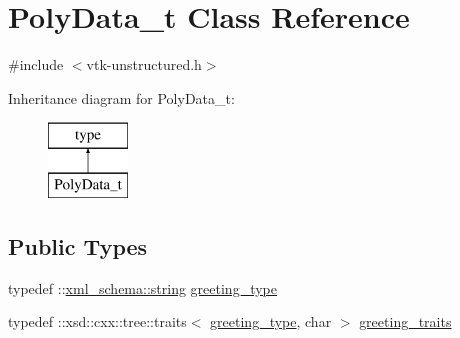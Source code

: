 \hypertarget{classPolyData__t}{}\section{Poly\+Data\+\_\+t Class Reference}
\label{classPolyData__t}


{\ttfamily \#include $<$vtk-\/unstructured.\+h$>$}

Inheritance diagram for Poly\+Data\+\_\+t\+:\begin{figure}[H]
\begin{center}
\leavevmode
\includegraphics[height=2.000000cm]{classPolyData__t}
\end{center}
\end{figure}
\subsection*{Public Types}
\begin{DoxyCompactItemize}
\item 
typedef \+::\hyperlink{namespacexml__schema_ac0cec83a330f0024e4e318b3deac5104}{xml\+\_\+schema\+::string} \hyperlink{classPolyData__t_ae1f86bd7b6a37a0d0851de8a44627177}{greeting\+\_\+type}
\item 
typedef \+::xsd\+::cxx\+::tree\+::traits$<$ \hyperlink{classPolyData__t_ae1f86bd7b6a37a0d0851de8a44627177}{greeting\+\_\+type}, char $>$ \hyperlink{classPolyData__t_a0825d12eafceffcedbb147730b8bf8a6}{greeting\+\_\+traits}
\end{DoxyCompactItemize}

